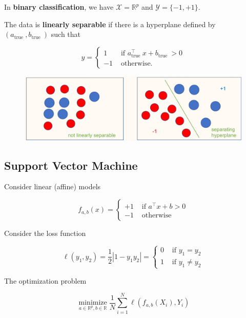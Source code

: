 \begin{definition}
    In \textbf{binary classification}, we have $\mathcal{X}=\mathbb{R}^{p}$ and $\mathcal{Y}=\{-1,+1\}$.

    The data is \textbf{linearly separable} if there is a hyperplane defined by $(a_{\text {true }}, b_{\text {true }} )$ such that

    $$
    y=\left\{\begin{array}{cl}
    1 & \text { if } a_{\text {true }}^{\top} x+b_{\text {true }}>0 \\
    -1 & \text { otherwise. }
    \end{array}\right.
    $$

    \begin{figure}[H]
        \centering
        \includegraphics[width=1.0\textwidth]{.././assets/3.1.jpg}
    \end{figure}
\end{definition}

\subsection{Support Vector Machine   }

Consider linear (affine) models

$$
f_{a, b}(x)= \begin{cases}+1 & \text { if } a^{\top} x+b>0 \\ -1 & \text { otherwise }\end{cases}
$$

Consider the loss function

$$
\ell\left(y_{1}, y_{2}\right)=\frac{1}{2}\left|1-y_{1} y_{2}\right|= \begin{cases}0 & \text { if } y_{1}=y_{2} \\ 1 & \text { if } y_{1} \neq y_{2}\end{cases}
$$

The optimization problem

$$
\underset{a \in \mathbb{R}^{p}, b \in \mathbb{R}}{\operatorname{minimize}} \frac{1}{N} \sum_{i=1}^{N} \ell\left(f_{a, b}\left(X_{i}\right), Y_{i}\right)
$$

